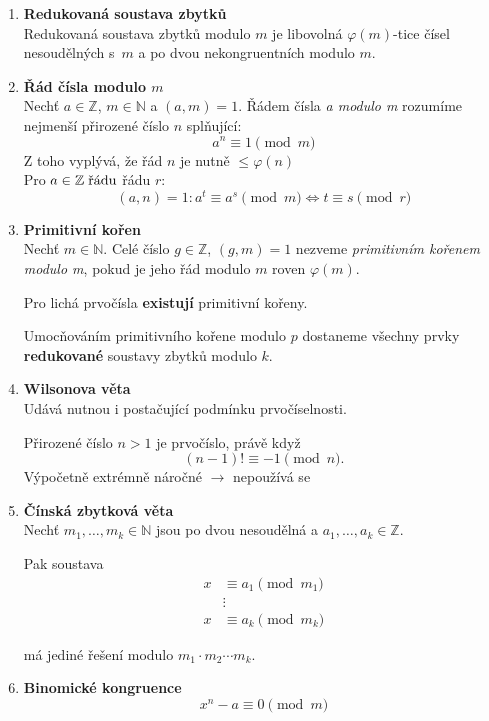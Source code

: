 \documentclass[12pt,a4paper]{article}
\begin{document}
\begin{enumerate}[leftmargin=*]
		\item \textbf{Redukovaná soustava zbytků}\\
		Redukovaná soustava zbytků modulo $m$ je libovolná $\varphi(m)$-tice
		čísel nesoudělných s~$m$ a po dvou nekongruentních modulo $m$.
		
		\item \textbf{Řád čísla modulo $m$}\\
		Nechť $a \in \mathbb{Z}$, $m \in \mathbb{N}$ a $(a,m) = 1$. Řádem čísla
		\textit{a modulo m} rozumíme nejmenší přirozené číslo $n$ splňující:
		\[ a^n \equiv 1 \pmod{m} \]
		Z toho vyplývá, že řád $ n $ je nutně $ \leq \varphi(n) $\\
		Pro  $a \in \mathbb{Z} \; \textnormal{řádu} $ řádu $ r$: \[ (a,n) = 1: a^t \equiv a^s \pmod{m} \Leftrightarrow t \equiv s \pmod{r} \] 
		
		\item \textbf{Primitivní kořen}\\
		Nechť $m \in \mathbb{N}$. Celé číslo $g \in \mathbb{Z}$, $(g,m) = 1$
		nezveme \textit{primitivním kořenem modulo m}, pokud je jeho řád modulo
		$m$ roven $\varphi(m)$.
		
		Pro lichá prvočísla \textbf{existují} primitivní kořeny.
		
		Umocňováním primitivního kořene modulo $p$ dostaneme všechny prvky
		\textbf{redukované} soustavy zbytků modulo $k$.
		
		\item \textbf{Wilsonova věta}\\
		Udává nutnou i postačující podmínku prvočíselnosti.
		
		Přirozené číslo $n > 1$ je prvočíslo, právě když
		\[ (n-1)! \equiv -1 \pmod{n}. \]
		Výpočetně extrémně náročné $\rightarrow$ nepoužívá se
		
		\pagebreak
		\item \textbf{Čínská zbytková věta}\\
		Nechť $m_1, \ldots, m_k \in \mathbb{N}$ jsou po dvou nesoudělná a
		$a_1, \ldots, a_k \in \mathbb{Z}$.
		
		Pak soustava
		\begin{align*}
		x &\equiv a_1 \pmod{m_1}\\
		&\vdots\\
		x &\equiv a_k \pmod{m_k}
		\end{align*}
		
		má jediné řešení modulo $m_1 \cdot m_2 \cdots m_k$.
		
		\item \textbf{Binomické kongruence}
		\[ x^n -a \equiv 0 \pmod{m} \]
		

\end{enumerate}
\end{document}
